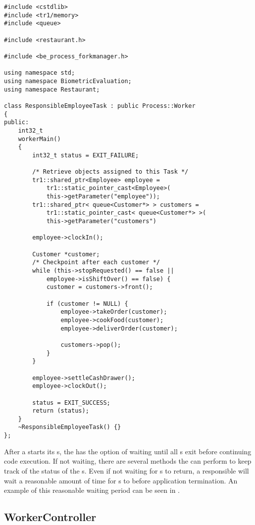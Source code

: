\begin{lstlisting}[caption={A Responsible \class{Worker} Implementation}, label=lst:process_worker-example]
#include <cstdlib>
#include <tr1/memory>
#include <queue>

#include <restaurant.h>

#include <be_process_forkmanager.h>

using namespace std;
using namespace BiometricEvaluation;
using namespace Restaurant;

class ResponsibleEmployeeTask : public Process::Worker
{
public:
	int32_t
	workerMain()
	{
		int32_t status = EXIT_FAILURE;
		
		/* Retrieve objects assigned to this Task */
		tr1::shared_ptr<Employee> employee =
		    tr1::static_pointer_cast<Employee>(
		    this->getParameter("employee"));
		tr1::shared_ptr< queue<Customer*> > customers = 
		    tr1::static_pointer_cast< queue<Customer*> >(
		    this->getParameter("customers")
		
		employee->clockIn();
		
		Customer *customer;
		/* Checkpoint after each customer */
		while (this->stopRequested() == false ||
		    employee->isShiftOver() == false) {
			customer = customers->front();
			
			if (customer != NULL) {
				employee->takeOrder(customer);
				employee->cookFood(customer);
				employee->deliverOrder(customer);
				
				customers->pop();
			}
		}
		
		employee->settleCashDrawer();
		employee->clockOut();
		
		status = EXIT_SUCCESS;
		return (status);
	}
	~ResponsibleEmployeeTask() {}
};
\end{lstlisting}

After a  starts its s, the  has the
option of waiting until all s exit 
before continuing code execution.  If not waiting,
there are several methods the  can perform to keep track of the status of the
s.  Even if not waiting for s to return,
a responsible  will wait a reasonable amount of time for
s to  before application termination.  An example of this
reasonable waiting period can be seen in .

\subsection{WorkerController}
\label{subsec-process_workercontroller}

